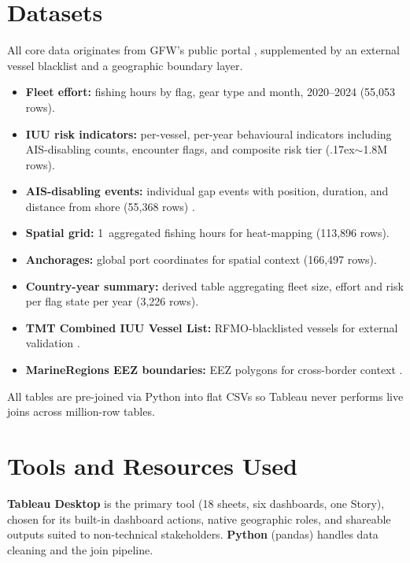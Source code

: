 \documentclass[sigconf]{acmart}
\begin{document}
\section{Datasets}
All core data originates from GFW's public portal \cite{GFW}, supplemented by an external vessel blacklist and a geographic boundary layer.
\begin{itemize}
    \item \textbf{Fleet effort:} fishing hours by flag, gear type and month, 2020--2024 (55,053 rows).
    \item \textbf{IUU risk indicators:} per-vessel, per-year behavioural indicators including AIS-disabling counts, encounter flags, and composite risk tier ({\raise.17ex\hbox{$\scriptstyle\sim$}}1.8M rows).
    \item \textbf{AIS-disabling events:} individual gap events with position, duration, and distance from shore (55,368 rows) \cite{Welch2022}.
    \item \textbf{Spatial grid:} 1\textdegree\ aggregated fishing hours for heat-mapping (113,896 rows).
    \item \textbf{Anchorages:} global port coordinates for spatial context (166,497 rows).
    \item \textbf{Country-year summary:} derived table aggregating fleet size, effort and risk per flag state per year (3,226 rows).
    \item \textbf{TMT Combined IUU Vessel List:} RFMO-blacklisted vessels for external validation \cite{TMT}.
    \item \textbf{MarineRegions EEZ boundaries:} EEZ polygons for cross-border context \cite{FlandersMarine}.
\end{itemize}
All tables are pre-joined via Python into flat CSVs so Tableau never performs live joins across million-row tables.

\section{Tools and Resources Used}
\textbf{Tableau Desktop} is the primary tool (18 sheets, six dashboards, one Story), chosen for its built-in dashboard actions, native geographic roles, and shareable outputs suited to non-technical stakeholders. \textbf{Python} (pandas) handles data cleaning and the join pipeline.
\end{document}
